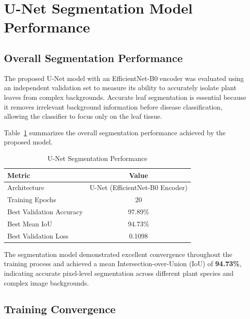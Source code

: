 \section{U-Net Segmentation Model Performance}
\label{sec:unet_results}

\subsection{Overall Segmentation Performance}

The proposed U-Net model with an EfficientNet-B0 encoder was evaluated using an independent validation set to measure its ability to accurately isolate plant leaves from complex backgrounds. Accurate leaf segmentation is essential because it removes irrelevant background information before disease classification, allowing the classifier to focus only on the leaf tissue.

Table~\ref{tab:unet_metrics} summarizes the overall segmentation performance achieved by the proposed model.

\begin{table}[H]
\centering
\caption{U-Net Segmentation Performance}
\label{tab:unet_metrics}
\renewcommand{\arraystretch}{1.4}
\begin{tabular}{lc}
\toprule
\textbf{Metric} & \textbf{Value} \\
\midrule
Architecture & U-Net (EfficientNet-B0 Encoder) \\
Training Epochs & 20 \\
Best Validation Accuracy & 97.89\% \\
Best Mean IoU & 94.73\% \\
Best Validation Loss & 0.1098 \\
\bottomrule
\end{tabular}
\end{table}

The segmentation model demonstrated excellent convergence throughout the training process and achieved a mean Intersection-over-Union (IoU) of \textbf{94.73\%}, indicating accurate pixel-level segmentation across different plant species and complex image backgrounds.

\subsection{Training Convergence}

